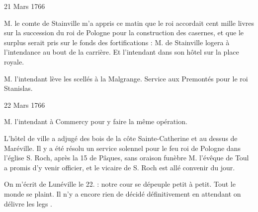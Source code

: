                      \begin{diary}{21 Mars 1766}{}


                           M. le comte de Stainville m'a appris ce
                           matin que le roi
                           accordait cent
                              mille livres
                           sur la succession du roi de Pologne pour la
                           construction des
                              casernes, et que le surplus
                           serait pris sur le fonds des fortifications :
                           M. de Stainville logera à
                              l'intendance
                           au bout de la carrière. Et l'intendant dans
                           son hôtel sur la place
                              royale. \bigskip



                           M. l'intendant lève les scellés à
                              la
                              Malgrange. Service aux Premontés pour
                           le roi Stanislas. \bigskip


                     \end{diary}

                     \begin{diary}{22 Mars 1766}{}


                           M. l'intendant à Commercy pour y
                           faire la même opération. \bigskip



                           L'hôtel de ville a adjugé
                           des bois de la
                              côte Sainte-Catherine et au dessus de Maréville.
                           Il y a été résolu un service solennel
                           pour le feu roi de Pologne dans l’église S.
                              Roch,
                           après la 15 de Pâques, sans oraison
                           funèbre
                           M. l'évêque de Toul a promis
                           d'y venir officier,
                           et le vicaire de S. Roch
                           est allé convenir du jour. \bigskip


                         On m'écrit de Lunéville
                           le 22. : \og notre cour
                              se dépeuple petit à petit. Tout le monde se
                              plaint. Il n'y a encore rien de décidé
                              définitivement en attendant on délivre les legs \fg{}. \bigskip


                     \end{diary}


